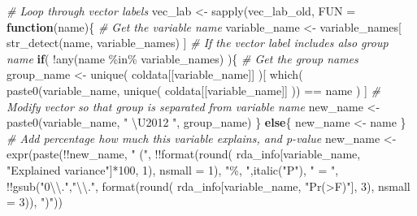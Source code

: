 \documentclass[
]{book}
\newenvironment{Shaded}{\begin{snugshade}}{\end{snugshade}}
\newcommand{\AttributeTok}[1]{\textcolor[rgb]{0.77,0.63,0.00}{#1}}
\newcommand{\CommentTok}[1]{\textcolor[rgb]{0.56,0.35,0.01}{\textit{#1}}}
\newcommand{\ControlFlowTok}[1]{\textcolor[rgb]{0.13,0.29,0.53}{\textbf{#1}}}
\newcommand{\DecValTok}[1]{\textcolor[rgb]{0.00,0.00,0.81}{#1}}
\newcommand{\FunctionTok}[1]{\textcolor[rgb]{0.00,0.00,0.00}{#1}}
\newcommand{\NormalTok}[1]{#1}
\newcommand{\OtherTok}[1]{\textcolor[rgb]{0.56,0.35,0.01}{#1}}
\newcommand{\SpecialCharTok}[1]{\textcolor[rgb]{0.00,0.00,0.00}{#1}}
\newcommand{\StringTok}[1]{\textcolor[rgb]{0.31,0.60,0.02}{#1}}
\begin{document}
\begin{Shaded}
\begin{Highlighting}[]
\CommentTok{\# Loop through vector labels}
\NormalTok{vec\_lab }\OtherTok{\textless{}{-}} \FunctionTok{sapply}\NormalTok{(vec\_lab\_old, }\AttributeTok{FUN =} \ControlFlowTok{function}\NormalTok{(name)\{}
    \CommentTok{\# Get the variable name}
\NormalTok{    variable\_name }\OtherTok{\textless{}{-}}\NormalTok{ variable\_names[ }\FunctionTok{str\_detect}\NormalTok{(name, variable\_names) ]}
    \CommentTok{\# If the vector label includes also group name}
    \ControlFlowTok{if}\NormalTok{( }\SpecialCharTok{!}\FunctionTok{any}\NormalTok{(name }\SpecialCharTok{\%in\%}\NormalTok{ variable\_names) )\{}
        \CommentTok{\# Get the group names}
\NormalTok{        group\_name }\OtherTok{\textless{}{-}} \FunctionTok{unique}\NormalTok{( coldata[[variable\_name]] )[ }
        \FunctionTok{which}\NormalTok{( }\FunctionTok{paste0}\NormalTok{(variable\_name, }\FunctionTok{unique}\NormalTok{( coldata[[variable\_name]] )) }\SpecialCharTok{==}\NormalTok{ name ) ]}
        \CommentTok{\# Modify vector so that group is separated from variable name}
\NormalTok{        new\_name }\OtherTok{\textless{}{-}} \FunctionTok{paste0}\NormalTok{(variable\_name, }\StringTok{" \textbackslash{}U2012 "}\NormalTok{, group\_name)}
\NormalTok{    \} }\ControlFlowTok{else}\NormalTok{\{}
\NormalTok{        new\_name }\OtherTok{\textless{}{-}}\NormalTok{ name}
\NormalTok{    \}}
    \CommentTok{\# Add percentage how much this variable explains, and p{-}value}
\NormalTok{    new\_name }\OtherTok{\textless{}{-}} \FunctionTok{expr}\NormalTok{(}\FunctionTok{paste}\NormalTok{(}\SpecialCharTok{!!}\NormalTok{new\_name, }\StringTok{" ("}\NormalTok{, }
                           \SpecialCharTok{!!}\FunctionTok{format}\NormalTok{(}\FunctionTok{round}\NormalTok{( rda\_info[variable\_name, }\StringTok{"Explained variance"}\NormalTok{]}\SpecialCharTok{*}\DecValTok{100}\NormalTok{, }\DecValTok{1}\NormalTok{), }\AttributeTok{nsmall =} \DecValTok{1}\NormalTok{), }
                           \StringTok{"\%, "}\NormalTok{,}\FunctionTok{italic}\NormalTok{(}\StringTok{"P"}\NormalTok{), }\StringTok{" = "}\NormalTok{, }
                           \SpecialCharTok{!!}\FunctionTok{gsub}\NormalTok{(}\StringTok{"0}\SpecialCharTok{\textbackslash{}\textbackslash{}}\StringTok{."}\NormalTok{,}\StringTok{"}\SpecialCharTok{\textbackslash{}\textbackslash{}}\StringTok{."}\NormalTok{, }\FunctionTok{format}\NormalTok{(}\FunctionTok{round}\NormalTok{( rda\_info[variable\_name, }\StringTok{"Pr(\textgreater{}F)"}\NormalTok{], }\DecValTok{3}\NormalTok{), }
                                                       \AttributeTok{nsmall =} \DecValTok{3}\NormalTok{)), }\StringTok{")"}\NormalTok{))}


\end{Highlighting}
\end{Shaded}
\end{document}
